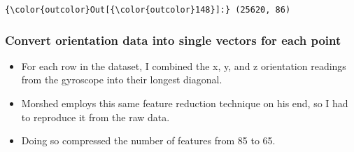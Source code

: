 \documentclass[11pt]{article}
\providecommand{\tightlist}{%
      \setlength{\itemsep}{0pt}\setlength{\parskip}{0pt}}
\begin{document}
\begin{Verbatim}[commandchars=\\\{\}]
{\color{outcolor}Out[{\color{outcolor}148}]:} (25620, 86)
\end{Verbatim}
            
    \hypertarget{convert-orientation-data-into-single-vectors-for-each-point}{%
\subsubsection{Convert orientation data into single vectors for each
point}\label{convert-orientation-data-into-single-vectors-for-each-point}}

\begin{itemize}
\tightlist
\item
  For each row in the dataset, I combined the x, y, and z orientation
  readings from the gyroscope into their longest diagonal.
\item
  Morshed employs this same feature reduction technique on his end, so I
  had to reproduce it from the raw data.
\item
  Doing so compressed the number of features from 85 to 65.
\end{itemize}
\end{document}
